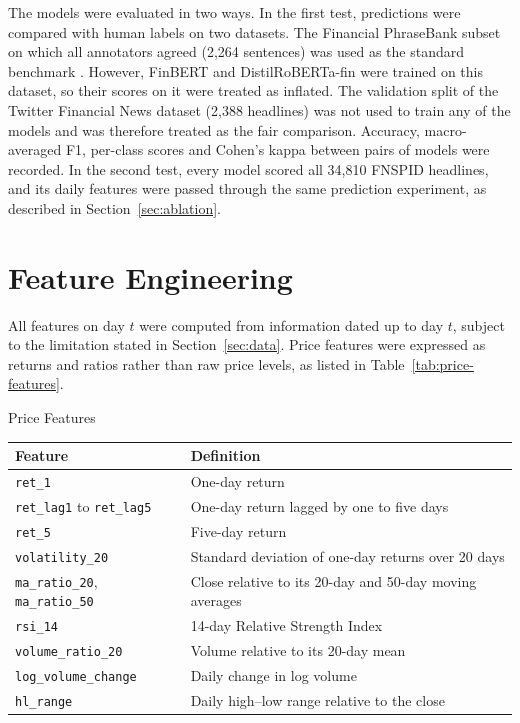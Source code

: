 The models were evaluated in two ways. In the first test, predictions were compared with human labels on two datasets. The Financial PhraseBank subset on which all annotators agreed (2,264 sentences) was used as the standard benchmark \parencite{malo2014good}. However, FinBERT and DistilRoBERTa-fin were trained on this dataset, so their scores on it were treated as inflated. The validation split of the Twitter Financial News dataset (2,388 headlines) \parencite{zeroshot2022twitter} was not used to train any of the models and was therefore treated as the fair comparison. Accuracy, macro-averaged F1, per-class scores and Cohen's kappa between pairs of models \parencite{cohen1960coefficient} were recorded. In the second test, every model scored all 34,810 FNSPID headlines, and its daily features were passed through the same prediction experiment, as described in Section~\ref{sec:ablation}.

\section{Feature Engineering}
\label{sec:features}
All features on day $t$ were computed from information dated up to day $t$, subject to the limitation stated in Section~\ref{sec:data}. Price features were expressed as returns and ratios rather than raw price levels, as listed in Table~\ref{tab:price-features}.

\begin{utptable}{Price Features}
\label{tab:price-features}
\begin{tabular}{@{}P{4.2cm}P{9.8cm}@{}}
\toprule
\textbf{Feature} & \textbf{Definition} \\
\midrule
\texttt{ret\_1} & One-day return \\
\texttt{ret\_lag1} to \texttt{ret\_lag5} & One-day return lagged by one to five days \\
\texttt{ret\_5} & Five-day return \\
\texttt{volatility\_20} & Standard deviation of one-day returns over 20 days \\
\texttt{ma\_ratio\_20}, \texttt{ma\_ratio\_50} & Close relative to its 20-day and 50-day moving averages \\
\texttt{rsi\_14} & 14-day Relative Strength Index \parencite{wilder1978new} \\
\texttt{volume\_ratio\_20} & Volume relative to its 20-day mean \\
\texttt{log\_volume\_change} & Daily change in log volume \\
\texttt{hl\_range} & Daily high--low range relative to the close \\
\bottomrule
\end{tabular}
\end{utptable}

